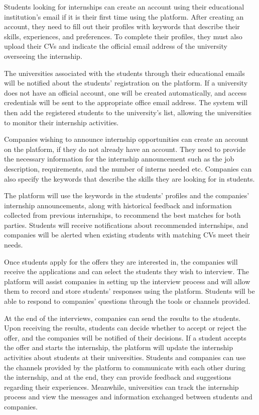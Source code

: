 Students looking for internships can create an account using their educational institution's email if it is their first time using the platform. 
After creating an account, they need to fill out their profiles with keywords that describe their skills, experiences, and preferences. To complete
their profiles, they must also upload their CVs and indicate the official email address of the university overseeing the internship.

The universities associated with the students through their educational emails will be notified about the students' registration on the platform. 
If a university does not have an official account, one will be created automatically, and access credentials will be sent to the appropriate office
email address. The system will then add the registered students to the university’s list, allowing the universities to monitor their internship 
activities.

Companies wishing to announce internship opportunities can create an account on the platform, if they do not already have an account. They need to
provide the necessary information for the internship announcement such as the job description, requirements, and the number of interns needed etc. 
Companies can also specify the keywords that describe the skills they are looking for in students.

The platform will use the keywords in the students' profiles and the companies' internship announcements, along with historical feedback and 
information collected from previous internships, to recommend the best matches for both parties. Students will receive notifications about 
recommended internships, and companies will be alerted when existing students with matching CVs meet their needs.

Once students apply for the offers they are interested in, the companies will receive the applications and can select the students they wish 
to interview. The platform will assist companies in setting up the interview process and will allow them to record and store students' responses 
using the platform. Students will be able to respond to companies' questions through the tools or channels provided.

At the end of the interviews, companies can send the results to the students. Upon receiving the results, students can decide whether to accept 
or reject the offer, and the companies will be notified of their decisions. If a student accepts the offer and starts the internship, the platform 
will update the internship activities about students at their universities. Students and companies can use the channels provided by the platform to
communicate with each other during the internship, and at the end, they can provide feedback and suggestions regarding their experiences. Meanwhile,
universities can track the internship process and view the messages and information exchanged between students and companies.


